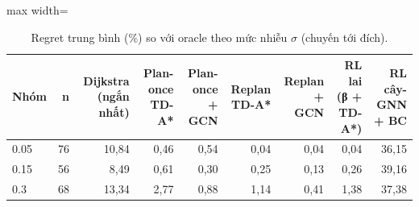 \begin{table}[!htbp]
\centering
\small
\caption{Regret trung bình (\%) so với oracle theo mức nhiễu $\sigma$ (chuyến tới đích).}
\label{tab:tab_by_sigma}
\begin{adjustbox}{max width=\linewidth}
\begin{tabular}{lrrrrrrrr}
\toprule
Nhóm & n & Dijkstra (ngắn nhất) & Plan-once TD-A* & Plan-once + GCN & Replan TD-A* & Replan + GCN & RL lai (β + TD-A*) & RL cây-GNN + BC \\
\midrule
0.05 & 76 & 10{,}84 & 0{,}46 & 0{,}54 & 0{,}04 & 0{,}04 & 0{,}04 & 36{,}15 \\
0.15 & 56 & 8{,}49 & 0{,}61 & 0{,}30 & 0{,}25 & 0{,}13 & 0{,}26 & 39{,}16 \\
0.3 & 68 & 13{,}34 & 2{,}77 & 0{,}88 & 1{,}14 & 0{,}41 & 1{,}38 & 37{,}38 \\
\bottomrule
\end{tabular}
\end{adjustbox}
\end{table}
